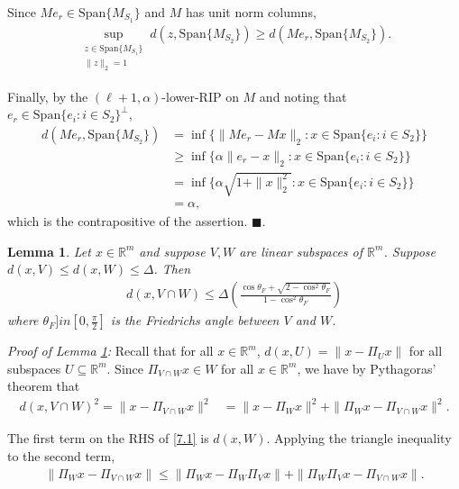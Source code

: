\documentclass[journal,onecolumn]{IEEEtran}
\newtheorem{lemma}{Lemma}
\begin{document}
Since $Me_r \in \text{Span}\{M_{S_1}\}$ and $M$ has unit norm columns,
\begin{align*}
\sup_{\substack{ z \in \text{Span}\{M_{S_1}\} \\ \|z\|_2 = 1} } d(z, \text{Span}\{M_{S_2}\})
\geq d(Me_r, \text{Span}\{M_{S_2}\}).
\end{align*}

Finally, by the $(\ell+1,\alpha)$-lower-RIP on $M$ and noting that $e_r \in \text{Span}\{e_i: i \in {S_2}\}^\perp$,
\begin{align*}
d(Me_r, \text{Span}\{M_{S_2}\}) 
&= \inf \{ \|Me_r - Mx\|_2 : x \in \text{Span}\{e_i: i \in {S_2}\} \} \\
&\geq \inf \{ \alpha\|e_r - x \|_2 : x \in  \text{Span}\{e_i: i \in {S_2}\} \} \\
&= \inf \{ \alpha \sqrt{1 + \|x\|_2^2} : x \in  \text{Span}\{e_i: i \in {S_2}\} \} \\
&= \alpha,
\end{align*}
%
which is the contrapositive of the assertion. \indent $\blacksquare$.


\begin{lemma}\label{DistanceToIntersectionLemma}
Let $x \in \mathbb{R}^m$ and suppose $V, W$ are linear subspaces of $\mathbb{R}^m$. Suppose $d(x,V) \leq d(x,W) \leq \Delta$. Then
\begin{align}
d(x, V \cap W) \leq \Delta \left( \frac{ \cos\theta_F + \sqrt{2 - \cos^2\theta_F} }{1 - \cos^2\theta_F} \right)
\end{align}
%
where $\theta_F ]in [0, \frac{\pi}{2}]$ is the Friedrichs angle between $V$ and $W$. 
\end{lemma}

\emph{Proof of Lemma \ref{DistanceToIntersectionLemma}:} Recall that for all $x \in \mathbb{R}^m$, $d(x, U) = \|x - \Pi_U x\|$ for all subspaces $U \subseteq \mathbb{R}^m$. Since $\Pi_{V \cap W}x \in W$ for all $x \in \mathbb{R}^m$, we have by Pythagoras' theorem that
\begin{align}\label{7.1}
d(x, V \cap W)^2 = \|x - \Pi_{V \cap W}x\|^2 &= \|x - \Pi_W x\|^2 + \|\Pi_Wx - \Pi_{V \cap W} x\|^2.
\end{align}

The first term on the RHS of \eqref{7.1} is $d(x,W)$. Applying the triangle inequality to the second term,
\begin{align}\label{7.2}
\|\Pi_Wx - \Pi_{V \cap W} x\| \leq \|\Pi_Wx - \Pi_W\Pi_V x\| + \|\Pi_W\Pi_Vx - \Pi_{V \cap W}x\|.
\end{align}
\end{document}
